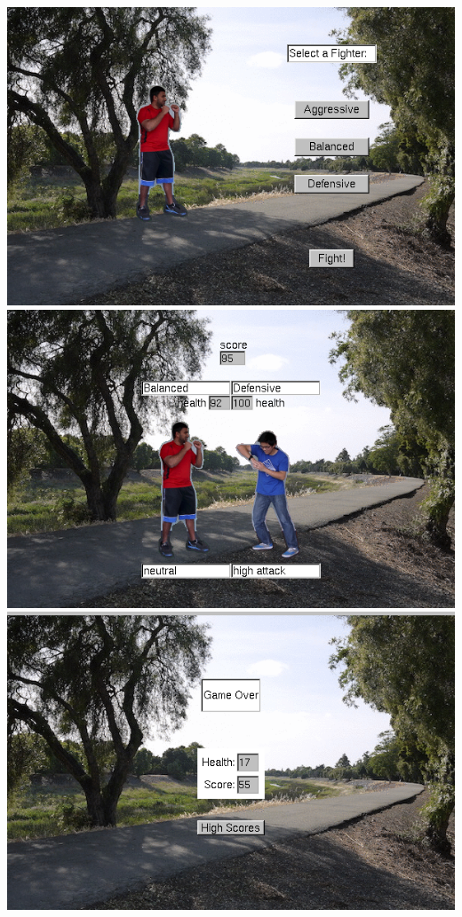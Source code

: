 \documentclass{article}
\begin{document}
\clearpage
\includegraphics[scale=0.5]{test4.png}
\clearpage
\includegraphics[scale=0.5]{test5.png}
\clearpage
\includegraphics[scale=0.5]{test6.png}
\end{document}
